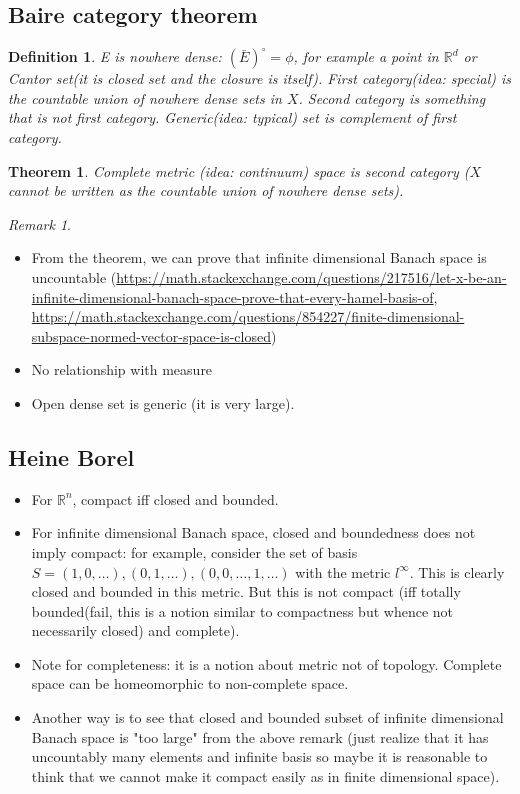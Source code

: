 \documentclass{article}
\newtheorem{theorem}{Theorem}
\newtheorem{definition}{Definition}
\theoremstyle{remark}
\newtheorem{remark}[example]{Remark}
\begin{document}
\begin{itemize}
\subsection*{Baire category theorem}
\begin{definition}
E is nowhere dense: $(\bar E)^\circ=\phi$, for example a point in $\mathbb{R}^d$ or Cantor set(it is closed set and the closure is itself).
First category(idea: special) is the countable union of nowhere dense sets in $X$. Second category is something that is not first category. Generic(idea: typical) set is complement of first category.
\end{definition}
\begin{theorem}
Complete metric (idea: continuum) space is second category ($X$ cannot be written as the countable union of nowhere dense sets).
\end{theorem}
\begin{remark}
\begin{itemize}
    \item From the theorem, we can prove that infinite dimensional Banach space is uncountable (\url{https://math.stackexchange.com/questions/217516/let-x-be-an-infinite-dimensional-banach-space-prove-that-every-hamel-basis-of}, \url{https://math.stackexchange.com/questions/854227/finite-dimensional-subspace-normed-vector-space-is-closed})
    \item No relationship with measure
    \item Open dense set is generic (it is very large).
\end{itemize}
\end{remark}
\subsection*{Heine Borel}
\begin{itemize}
    \item For $\mathbb{R}^n$, compact iff closed and bounded.
    \item For infinite dimensional Banach space, closed and boundedness does not imply compact: for example, consider the set of basis $S=(1,0,\dots), (0, 1, \dots), (0, 0, \dots, 1, \dots)$ with the metric $l^\infty$. This is clearly closed and bounded in this metric. But this is not compact (iff totally bounded(fail, this is a notion similar to compactness but whence not necessarily closed) and complete).
    \item Note for completeness: it is a notion about metric not of topology. Complete space can be homeomorphic to non-complete space.
    \item Another way is to see that closed and bounded subset of infinite dimensional Banach space is "too large" from the above remark (just realize that it has uncountably many elements and infinite basis so maybe it is reasonable to think that we cannot make it compact easily as in finite dimensional space).
\end{itemize}

\end{itemize}
\end{document}
